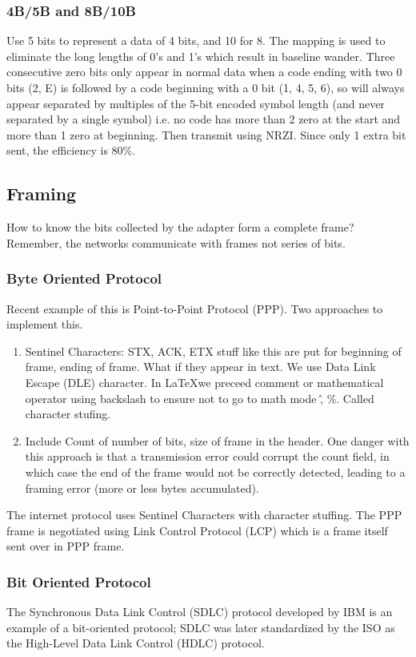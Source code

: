 \documentclass[11pt, a4paper]{article}
\begin{document}
\subsubsection{4B/5B and 8B/10B}
Use 5 bits to represent a data of 4 bits, and 10 for 8. The mapping is used to eliminate the long lengths of 0's and 1's which result in baseline wander. Three consecutive zero bits only appear in normal data when a code ending with two 0 bits (2, E) is followed by a code beginning with a 0 bit (1, 4, 5, 6), so will always appear separated by multiples of the 5-bit encoded symbol length (and never separated by a single symbol) i.e. no code has more than 2 zero at the start and more than 1 zero at beginning. Then transmit using NRZI. Since only 1 extra bit sent, the efficiency is 80\%.

\subsection{Framing}
How to know the bits collected by the adapter form a complete frame? Remember, the networks communicate with frames not series of bits.
\subsubsection{Byte Oriented Protocol}
Recent example of this is Point-to-Point Protocol (PPP). Two approaches to implement this.
\begin{enumerate}
    \item Sentinel Characters: STX, ACK, ETX stuff like this are put for beginning of frame, ending of frame. What if they appear in text. We use Data Link Escape (DLE) character. In \LaTeX we preceed comment or mathematical operator using backslash to ensure not to go to math mode \^, \%. Called character stufing.
    \item Include Count of number of bits, size of frame in the header. One danger with this approach is that a transmission error could corrupt the count field, in which case the end of the frame would not be correctly detected, leading to a framing error (more or less bytes accumulated).
\end{enumerate}
The internet protocol uses Sentinel Characters with character stuffing. The PPP frame is negotiated using Link Control Protocol (LCP) which is a frame itself sent over in PPP frame.

\subsubsection{Bit Oriented Protocol}
The Synchronous Data Link Control (SDLC) protocol developed by IBM is an example of a bit-oriented protocol; SDLC was later standardized by the ISO as the High-Level Data Link Control (HDLC) protocol.\\
\end{document}
